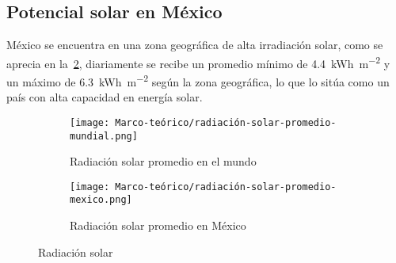 	\subsection{Potencial solar en México}

			México se encuentra en una zona geográfica de alta irradiación solar, como se aprecia en la~\cref{fig:radiacion-solar-promedio-mexico}, diariamente se recibe un promedio mínimo de \SI{4.4}{\kWh\per\m\tothe{2}} y un máximo de \SI{6.3}{\kWh\per\m\tothe{2}} según la zona geográfica, lo que lo sitúa como un país con alta capacidad en energía solar.

			\begin{figure}[H]
			\centering
			\begin{subfigure}[b]{0.45\textwidth}
				\centering
				\texttt{[image: Marco-teórico/radiación-solar-promedio-mundial.png]}
				\caption{Radiación solar promedio en el mundo}
				\label{fig:radiacion-solar-promedio-mundial}
			\end{subfigure}
			\hfill
			\begin{subfigure}[b]{0.45\textwidth}
				\centering
				\texttt{[image: Marco-teórico/radiación-solar-promedio-mexico.png]}
				\caption{Radiación solar promedio en México}
				\label{fig:radiacion-solar-promedio-mexico}
			\end{subfigure}
			\caption{Radiación solar}
			\label{fig:radiacion-solar}
		\end{figure}